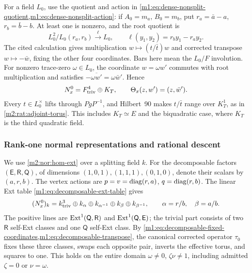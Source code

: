 For a field $L_0$, use the quotient and action in
\cref{m1:eq:dense-nonsplit-quotient,m1:eq:dense-nonsplit-action}:
if $A_0=m_a$, $B_0=m_b$, put $r_a=\bar a-a$, $r_b=\bar b-b$.
At least one is nonzero, and the root quotient is
\begin{equation}\label{m2:nor:anis-root-coordinate}
 L_0^2/L_0(r_a,r_b)\xrightarrow{\ \ell\ }L_0,
 \qquad\ell(y_1,y_2)=r_by_1-r_ay_2.
\end{equation}
The cited calculation gives multiplication $w\mapsto(t/\bar t)w$
and corrected transpose $w\mapsto-\bar w$, fixing the other four
coordinates. Bars here mean the $L_0/F$ involution. For nonzero
trace-zero $\omega\in L_0$, the coordinate $w=\omega w'$ commutes
with root multiplication and satisfies
$-\overline{\omega w'}=\omega\bar w'$. Hence
\begin{equation}\label{m2:nor:dense-anis}
 N_x^0=F^4_{\mathrm{triv}}\oplus K_T,\qquad
 \Theta_x(z,w')=(z,\bar w').
\end{equation}
Every $t\in L_0^\times$ lifts through $PgP^{-1}$, and Hilbert~90
makes $t/\bar t$ range over $K_T^1$, as in
\cref{m2:rat:adjoint-torus}. This includes $K_T\simeq E$ and the
biquadratic case, where $K_T$ is the third quadratic field.

\subsubsection{Rank-one normal representations and rational descent}

We use \eqref{m2:nor:hom-ext} over a splitting field $k$. For the
decomposable factors $(\mathsf E,\mathsf R,\mathsf Q)$, of dimensions
$(1,0,1),(1,1,1),(0,1,0)$, denote their scalars by $(a,r,b)$.
The vertex actions are $p=v=\operatorname{diag}(r,a)$, $q=\operatorname{diag}(r,b)$.
The linear Ext table \eqref{m1:eq:decomposable-ext-table} gives
\begin{equation}\label{m2:nor:dec-geometric}
 (N_x^0)_k=k^3_{\mathrm{triv}}\oplus k_\alpha\oplus k_{\alpha^{-1}}
                         \oplus k_\beta\oplus k_{\beta^{-1}},
 \qquad \alpha=r/b,\quad\beta=a/b.
\end{equation}
The positive lines are $\operatorname{Ext}^1(\mathsf Q,\mathsf R)$ and
$\operatorname{Ext}^1(\mathsf Q,\mathsf E)$; the trivial part consists of two
$\mathsf R$ self-Ext classes and one $\mathsf Q$ self-Ext class.
By \cref{m1:eq:decomposable-fixed-coordinates,m1:eq:decomposable-transpose},
the canonical corrected operator $\tau_0$ fixes these three classes,
swaps each opposite pair, inverts the effective torus, and squares
to one. This holds on the entire domain $\omega\ne0$, $\zeta\nu\ne1$,
including admitted $\zeta=0$ or $\nu=\omega$.

